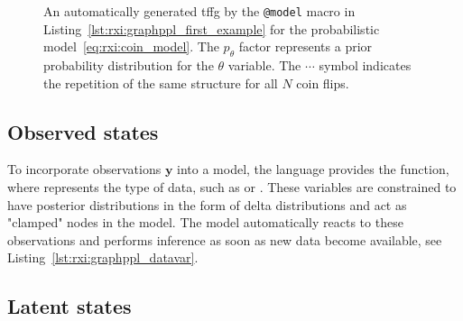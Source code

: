 \begin{figure}
  \centering
  \resizebox{0.9\textwidth}{!}{}
  \caption{An automatically generated \ac{tffg} by the \texttt{@model} macro in Listing~\ref{lst:rxi:graphppl_first_example} for the probabilistic model~\eqref{eq:rxi:coin_model}.
  The $p_\theta$ factor represents a prior probability distribution for the $\theta$ variable.
    The $\cdots$ symbol indicates the repetition of the same structure for all $N$ coin flips.
  }
  \label{fig:rxi:coin_model}
\end{figure}

\subsection{Observed states}

To incorporate observations $\bm{y}$ into a model, the language provides the
 function, where  represents the type of data, such as
 or .
These variables are constrained to have posterior distributions in the form of delta
distributions and act as "clamped" nodes in the model.
The model automatically reacts to these observations and performs inference as soon as new
data become available, see Listing~\ref{lst:rxi:graphppl_datavar}.
\begin{figure*}[h!]
  \begin{adjustbox}{minipage=\textwidth,margin=0pt \smallskipamount,center}
  \end{adjustbox}
\end{figure*}

\subsection{Latent states}

